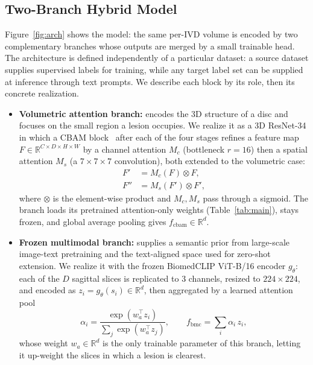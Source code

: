 \documentclass[runningheads]{llncs}
\begin{document}
\subsection{Two-Branch Hybrid Model}\label{wf}

Figure~\ref{fig:arch} shows the model: the same per-IVD volume is encoded by two complementary branches whose outputs are merged by a small trainable head. The architecture is defined independently of a particular dataset: a source dataset supplies supervised labels for training, while any target label set can be supplied at inference through text prompts. We describe each block by its role, then its concrete realization.
\begin{itemize}
\item \textbf{Volumetric attention branch:} encodes the 3D structure of a disc and focuses on the small region a lesion occupies. We realize it as a 3D ResNet-34 in which a CBAM block~\cite{woo2018cbam} after each of the four stages refines a feature map $F \in \mathbb{R}^{C \times D \times H \times W}$ by a channel attention $M_c$ (bottleneck $r=16$) then a spatial attention $M_s$ (a $7\!\times\!7\!\times\!7$ convolution), both extended to the volumetric case:
\begin{align}
F' &= M_c(F) \otimes F, \label{eq:cbam_c}\\
F'' &= M_s(F') \otimes F', \label{eq:cbam_s}
\end{align}
where $\otimes$ is the element-wise product and $M_c, M_s$ pass through a sigmoid. The branch loads its pretrained attention-only weights (Table~\ref{tab:main}), stays frozen, and global average pooling gives $f_{\text{cbam}} \in \mathbb{R}^{d}$.

\item \textbf{Frozen multimodal branch:} supplies a semantic prior from large-scale image-text pretraining and the text-aligned space used for zero-shot extension. We realize it with the frozen BiomedCLIP ViT-B/16 encoder $g_\theta$: each of the $D$ sagittal slices is replicated to 3 channels, resized to $224\times224$, and encoded as $z_i = g_\theta(s_i) \in \mathbb{R}^{d}$, then aggregated by a learned attention pool
\begin{equation}
\alpha_i = \frac{\exp(w_a^\top z_i)}{\sum_{j} \exp(w_a^\top z_j)},
\qquad
f_{\text{bmc}} = \sum_{i} \alpha_i \, z_i,
\label{eq:slicepool}
\end{equation}
whose weight $w_a \in \mathbb{R}^{d}$ is the only trainable parameter of this branch, letting it up-weight the slices in which a lesion is clearest.


\end{itemize}
\end{document}
